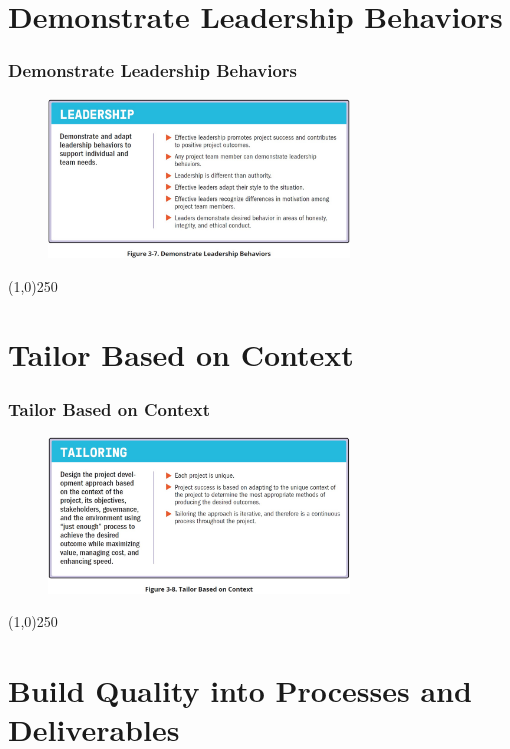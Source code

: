 \section{Demonstrate Leadership Behaviors}


\begin{frame}
\frametitle{Demonstrate Leadership Behaviors}
 \begin{figure}
    \centering
        \includegraphics[width = 8cm]{../images/standard/Fig3-7.jpg}
    \label{standardfig:3-7}
 \end{figure}
\end{frame}
\begin{center}\line(1,0){250}\end{center}



\section{Tailor Based on Context}


\begin{frame}
\frametitle{Tailor Based on Context}
 \begin{figure}
    \centering
        \includegraphics[width = 8cm]{../images/standard/Fig3-8.jpg}
    \label{standardfig:3-8}
 \end{figure}
\end{frame}
\begin{center}\line(1,0){250}\end{center}




\section{Build Quality into Processes and Deliverables}



